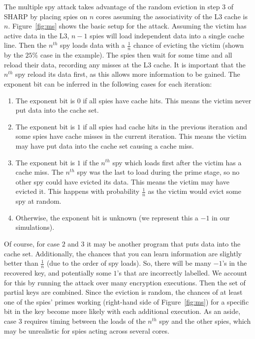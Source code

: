 \documentclass[12pt]{article}
\begin{document}
The multiple spy attack takes advantage of the random eviction in step $3$ of SHARP by placing spies on $n$ cores assuming the associativity of the L3 cache is $n$.
Figure~\ref{fig:ms} shows the basic setup for the attack.
Assuming the victim has active data in the L3, $n-1$ spies will load independent data into a single cache line.
Then the $n^{th}$ spy loads data with a $\frac{1}{n}$ chance of evicting the victim (shown by the $25\%$ case in the example).
The spies then wait for some time and all reload their data, recording any misses at the L3 cache.
It is important that the $n^{th}$ spy reload its data first, as this allows more information to be gained.
The exponent bit can be inferred in the following cases for each iteration:

\begin{enumerate}

\item The exponent bit is $0$ if all spies have cache hits. This means the victim never put data into the cache set.
\item The exponent bit is $1$ if all spies had cache hits in the previous iteration and some spies have cache misses in the current iteration. This means the victim may have put data into the cache set causing a cache miss.
\item The exponent bit is $1$ if the $n^{th}$ spy which loads first after the victim has a cache miss. The $n^{th}$ spy was the last to load during the prime stage, so no other spy could have evicted its data. This means the victim may have evicted it. This happens with probability $\frac{1}{n}$ as the victim would evict some spy at random.
\item Otherwise, the exponent bit is unknown (we represent this a $-1$ in our simulations).

\end{enumerate}

Of course, for case $2$ and $3$ it may be another program that puts data into the cache set.
Additionally, the chances that you can learn information are slightly better than $\frac{1}{n}$ (due to the order of spy loads).
So, there will be many $-1$'s in the recovered key, and potentially some $1$'s that are incorrectly labelled. 
We account for this by running the attack over many encryption executions.
Then the set of partial keys are combined.
Since the eviction is random, the chances of at least one of the spies' primes working (right-hand side of Figure~\ref{fig:ms}) for a specific bit in the key become more likely with each additional execution.
As an aside, case $3$ requires timing between the loads of the $n^{th}$ spy and the other spies, which may be unrealistic for spies acting across several cores.
\end{document}
